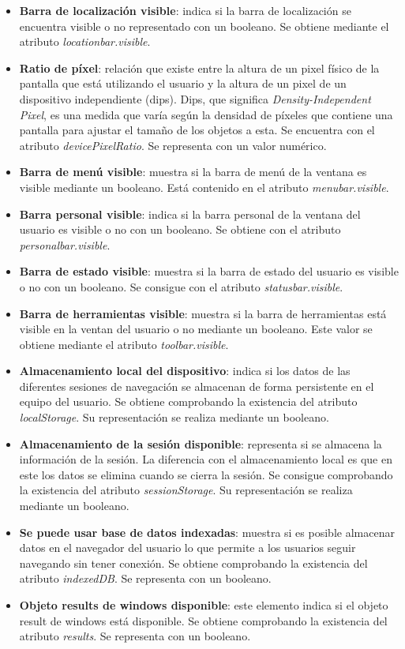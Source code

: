 \begin{itemize} 
    \item \textbf{Barra de localización visible}: indica si la barra de localización se encuentra visible o no representado con un booleano. Se obtiene mediante el atributo \textit{locationbar.visible}.
    \item \textbf{Ratio de píxel}: relación que existe entre la altura de un pixel físico de la pantalla que está utilizando el usuario y la altura de un pixel de un dispositivo independiente (dips). Dips, que significa \textit{Density-Independent Pixel}, es una medida que varía según la densidad de píxeles que contiene una pantalla para ajustar el tamaño de los objetos a esta. Se encuentra con el atributo \textit{devicePixelRatio}. Se representa con un valor numérico.
    \item \textbf{Barra de menú visible}: muestra si la barra de menú de la ventana es visible mediante un booleano. Está contenido en el atributo \textit{menubar.visible}.
    \item \textbf{Barra personal visible}: indica si la barra personal de la ventana del usuario es visible o no con un booleano. Se obtiene con el atributo \textit{personalbar.visible}.
    \item \textbf{Barra de estado visible}: muestra si la barra de estado del usuario es visible o no con un booleano. Se consigue con el atributo \textit{statusbar.visible}.
    \item \textbf{Barra de herramientas visible}: muestra si la barra de herramientas está visible en la ventan del usuario o no mediante un booleano. Este valor se obtiene mediante el atributo \textit{toolbar.visible}.
    \item \textbf{Almacenamiento local del dispositivo}: indica si los datos de las diferentes sesiones de navegación se almacenan de forma persistente en el equipo del usuario. Se obtiene comprobando la existencia del atributo \textit{localStorage}. Su representación se realiza mediante un booleano.
    \item \textbf{Almacenamiento de la sesión disponible}: representa si se almacena la información de la sesión. La diferencia con el almacenamiento local es que en este los datos se elimina cuando se cierra la sesión. Se consigue comprobando la existencia del atributo \textit{sessionStorage}. Su representación se realiza mediante un booleano.
    \item \textbf{Se puede usar base de datos indexadas}: muestra si es posible almacenar datos en el navegador del usuario lo que permite a los usuarios seguir navegando sin tener conexión. Se obtiene comprobando la existencia del atributo \textit{indexedDB}. Se representa con un booleano.
    \item \textbf{Objeto results de windows disponible}: este elemento indica si el objeto result de windows está disponible. Se obtiene comprobando la existencia del atributo \textit{results}. Se representa con un booleano.
\end{itemize}
